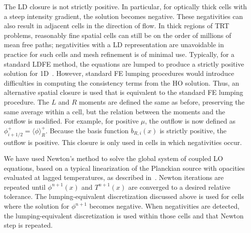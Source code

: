 \documentclass{mc2013}
\newcommand{\mom}[1]{\langle #1 \rangle}
\begin{document}
The LD closure is not strictly positive.  In particular, for
optically thick cells with a steep intensity gradient, the solution becomes negative.
These negativities can also result in adjacent cells in the direction of flow. In thick regions of
TRT problems, reasonably fine spatial cells can still be on the order of millions of mean
free paths; negativities with a LD representation are unavoidable in practice for
such cells and mesh refinement is of minimal use.  Typically, for a standard LDFE method,
the equations are lumped to produce a strictly positive solution for 1D~\cite{morel_newton}. However, standard FE lumping
procedures would introduce difficulties in computing the consistency terms from the
HO solution.  Thus, an alternative spatial closure is used that is equivalent to the
standard FE lumping procedure.  The $L$ and $R$ moments are defined the same as before,
preserving the same average within a cell, but the relation between the moments and
the outflow is modified.   For example, for positive $\mu$,
the outflow is now defined as $\phi^+_{i+1/2} = \mom{\phi}_R^+.$  Because the basis function $b_{R,i}(x)$ is strictly
positive, the outflow is positive.  This closure is only used
in cells in which negativities occur.


We have used Newton's method to solve the global system of coupled LO
equations, based on a typical linearization of the Planckian source with opacities
evaluated at lagged temperatures, as described in~\cite{morel_newton}.  
Newton iterations are repeated until $\phi^{n+1}(x)$ and $T^{n+1}(x)$ are converged
to a desired relative tolerance.  The lumping-equivalent discretization
discussed above is used for cells where the solution for
$\phi^{n+1}$ becomes negative. When negativities are detected, the lumping-equivalent discretization is used within
those cells and that Newton step is repeated. 
\end{document}
